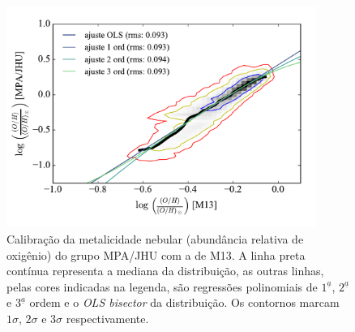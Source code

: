 \begin{figure}
	\centering
	\includegraphics[width=0.9\textwidth]{figuras/logOH_ZnebMPA.pdf}
	\caption[Calibração das metalicidades.]
	{Calibração da metalicidade nebular (abundância relativa de oxigênio) do grupo MPA/JHU com a de
M13. A linha preta contínua representa a mediana da distribuição, as outras linhas, pelas cores
indicadas na legenda, são regressões polinomiais de $1^\underline{a}$, $2^\underline{a}$ e
$3^\underline{a}$ ordem e o {\em OLS bisector} da distribuição. Os contornos marcam $1\sigma$,
$2\sigma$ e $3\sigma$ respectivamente.}
	\label{fig:calibZ}
\end{figure}



